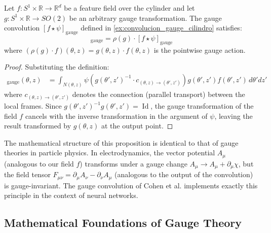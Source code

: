 \begin{proposition}\label{prop:gauge_equivarianza_cilindro}
Let $f: S^1 \times \mathbb{R} \to \mathbb{R}^d$ be a feature field over the cylinder and let $g: S^1 \times \mathbb{R} \to SO(2)$ be an arbitrary gauge transformation. The gauge convolution $[f \star \psi]_{\text{gauge}}$ defined in \autoref{ex:convolucion_gauge_cilindro} satisfies:
\begin{equation}
[(\rho(g) \cdot f) \star \psi]_{\text{gauge}} = \rho(g) \cdot [f \star \psi]_{\text{gauge}}
\end{equation}
where $(\rho(g) \cdot f)(\theta, z) = g(\theta,z) \cdot f(\theta, z)$ is the pointwise gauge action.
\end{proposition}

\begin{proof}
Substituting the definition:
\begin{align}
[(\rho(g) \cdot f) \star \psi]_{\text{gauge}}(\theta, z) &= \int_{N(\theta,z)} \psi\left(g(\theta',z')^{-1} \cdot c_{(\theta,z) \to (\theta',z')}\right) g(\theta',z') f(\theta',z') \, d\theta' dz'
\end{align}
where $c_{(\theta,z) \to (\theta',z')}$ denotes the connection (parallel transport) between the local frames. Since $g(\theta',z')^{-1} g(\theta',z') = \operatorname{Id}$, the gauge transformation of the field $f$ cancels with the inverse transformation in the argument of $\psi$, leaving the result transformed by $g(\theta,z)$ at the output point.
\end{proof}

\begin{remark}
The mathematical structure of this proposition is identical to that of gauge theories in particle physics. In electrodynamics, the vector potential $A_\mu$ (analogous to our field $f$) transforms under a gauge change $A_\mu \to A_\mu + \partial_\mu \chi$, but the field tensor $F_{\mu\nu} = \partial_\mu A_\nu - \partial_\nu A_\mu$ (analogous to the output of the convolution) is gauge-invariant. The gauge convolution of Cohen et al. implements exactly this principle in the context of neural networks.
\end{remark}

\subsection{Mathematical Foundations of Gauge Theory}\label{subsec:fundamentos_matematicos_gauge}

